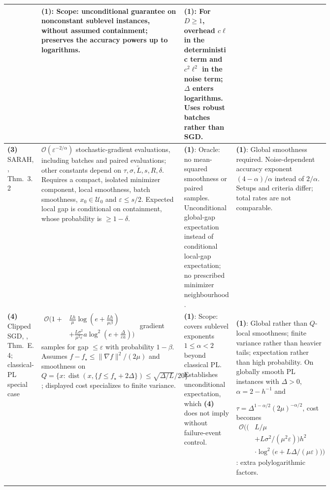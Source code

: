 \begin{table}[tp]
\begin{threeparttable}
\begin{tabularx}{\linewidth}{@{}>{\raggedright\arraybackslash}p{0.20\linewidth}>{\raggedright\arraybackslash}p{0.32\linewidth}>{\raggedright\arraybackslash}p{0.235\linewidth}>{\raggedright\arraybackslash}X@{}}
& \textbf{(1)}: Scope: unconditional guarantee on nonconstant sublevel instances, without assumed containment; preserves the accuracy powers up to logarithms.
& \textbf{(1)}: For $D\ge1$, overhead $c\ell$ in the deterministic term and $c^2\ell^2$ in the noise term; $\Delta$ enters logarithms. Uses robust batches rather than SGD. \\
\midrule
\textbf{(3)} SARAH, \citep{splMasihaLocal2026v2}, Thm.~3.2
& $\mathcal{O}(\varepsilon^{-2/\alpha})$ stochastic-gradient evaluations, including batches and paired evaluations; other constants depend on $\tau,\sigma,\widetilde L,s,R,\delta$. Requires a compact, isolated minimizer component, local smoothness, batch smoothness, $x_0\in\mathcal U_0$ and $\varepsilon\le s/2$. Expected local gap is conditional on containment, whose probability is $\ge1-\delta$.
& \textbf{(1)}: Oracle: no mean-squared smoothness or paired samples. Unconditional global-gap expectation instead of conditional local-gap expectation; no prescribed minimizer neighbourhood.
& \textbf{(1)}: Global smoothness required. Noise-dependent accuracy exponent $(4-\alpha)/\alpha$ instead of $2/\alpha$. Setups and criteria differ; total rates are not comparable. \\
\midrule
\textbf{(4)} Clipped SGD, \citep{splSadiev2023v2}, Thm.~E.4; classical-PL special case
& $\begin{aligned}\mathcal{O}\!\biggl(1+&\frac{Lh}{\mu}\log\!\left(e+\frac{Lh}{\mu\beta}\right)\\[-2pt]&+\frac{L\sigma^2}{\mu^2\varepsilon}a\log^2\!\left(e+\frac{\Delta}{\varepsilon a}\right)\biggr)\end{aligned}$ gradient samples for gap $\le\varepsilon$ with probability $1-\beta$. Assumes $f-f_\star\le\|\nabla f\|^2/(2\mu)$ and smoothness on $Q=\{x:\operatorname{dist}(x,\{f\le f_\star+2\Delta\})\le\sqrt{\Delta/L}/20\}$; displayed cost specializes to finite variance.
& \textbf{(1)}: Scope: covers sublevel exponents $1\le\alpha<2$ beyond classical PL. Establishes unconditional expectation, which \textbf{(4)} does not imply without failure-event control.
& \textbf{(1)}: Global rather than $Q$-local smoothness; finite variance rather than heavier tails; expectation rather than high probability. On globally smooth PL instances with $\Delta>0$, $\alpha=2-h^{-1}$ and\par $\tau=\Delta^{1-\alpha/2}(2\mu)^{-\alpha/2}$, cost becomes $\begin{aligned}\mathcal{O}\!\bigl((&L/\mu\\&+L\sigma^2/(\mu^2\varepsilon))h^2\\&\cdot\log^2\!\bigl(e+L\Delta/(\mu\varepsilon)\bigr)\bigr)\end{aligned}$: extra polylogarithmic factors. \\

\end{tabularx}
\end{threeparttable}
\end{table}

